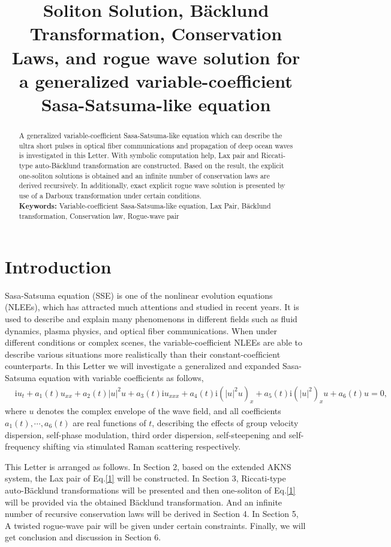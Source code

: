 \documentclass[12pt]{article}
\title{\large\bfseries Soliton Solution, B\"acklund Transformation, Conservation Laws, and rogue wave solution for a generalized variable-coefficient Sasa-Satsuma-like equation}
\author{}
\begin{document}
\maketitle

\begin{abstract}
A generalized variable-coefficient Sasa-Satsuma-like equation which can describe the ultra short pulses in optical fiber communications and propagation of deep ocean waves is investigated in this Letter. With symbolic computation help, Lax pair and Riccati-type auto-B\"acklund transformation are constructed. Based on the result, the explicit one-soliton solutions is obtained and an infinite number of conservation laws are derived recursively. In additionally, exact explicit rogue wave solution is presented by use of a Darboux transformation under certain conditions. \\
\indent\textbf{Keywords:} Variable-coefficient Sasa-Satsuma-like equation, Lax Pair, B\"acklund transformation, Conservation law, Rogue-wave pair
\end{abstract}

\section{Introduction}
Sasa-Satsuma equation (SSE) is one of the nonlinear evolution equations (NLEEs), which has attracted much attentions and studied in recent years. It is used to describe and explain many phenomenons in different fields such as fluid dynamics, plasma physics, and optical fiber communications.\cite{1,2,3,4,5,6,7,8,9} When under different conditions or complex scenes, the variable-coefficient NLEEs are able to describe various situations more realistically than their constant-coefﬁcient counterparts.\cite{8,9} In this Letter we will investigate a generalized and expanded Sasa-Satsuma equation with variable coefficients as follows,
\begin{align}
  & \mathrm{i}u_{t} + a_{1}(t)u_{xx} + a_2(t)|u|^{2}u + a_3(t)\mathrm{i}u_{xxx} + a_{4}(t)\mathrm{i}(|u|^{2}u)_{x} + a_{5}(t)\mathrm{i}(|u|^{2})_{x}u + a_{6}(t)u = 0,   \label{1}
\end{align}
where $u$ denotes the complex envelope of the wave field, and all coefficients $a_{1}(t), \cdots, a_{6}(t)$ are real functions of $t$, describing the effects of group velocity dispersion, self-phase modulation, third order dispersion, self-steepening and self-frequency shifting via stimulated Raman scattering respectively.

This Letter is arranged as follows. In Section 2, based on the extended AKNS system, the Lax pair of Eq.\eqref{1} will be constructed. In Section 3, Riccati-type auto-B\"acklund transformations will be presented and then one-soliton of Eq.\eqref{1} will be provided via the obtained B\"acklund transformation. And an infinite number of recursive conservation laws will be derived in Section 4. In Section 5, A twisted rogue-wave pair will be given under certain constraints. Finally, we will get conclusion and discussion in Section 6.
\end{document}
